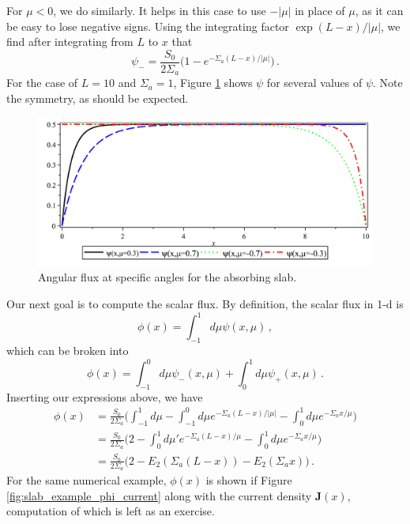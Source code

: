 For $\mu<0$, we do similarly.  It helps in this case to use $-|\mu|$ in place of $\mu$, as it can be easy to lose negative signs.  Using the integrating factor $\exp{(L-x)/|\mu|}$, we find after integrating from $L$ to $x$ that
\begin{equation}
 \psi_{-} = \frac{S_0}{2\Sigma_a}\Bigg (1 - e^{-\Sigma_a (L-x)/|\mu|} \Bigg ) \, .
\end{equation}
For the case of $L = 10$ and $\Sigma_a = 1$, Figure \ref{fig:slab_example_psi} shows $\psi$ for several values of $\psi$.  Note the symmetry, as should be expected. 

\begin{figure}[ht] 
    \centering
    \includegraphics[keepaspectratio, width = 5.0 in]{images/slab_example_psi}
    \caption{Angular flux at specific angles for the absorbing slab.}
    \label{fig:slab_example_psi}
\end{figure}

Our next goal is to compute the scalar flux.  By definition, the scalar flux in 1-d is
\begin{equation}
 \phi(x) = \int^1_{-1} d\mu \psi(x,\mu) \, ,
\end{equation}
which can be broken into
\begin{equation}
  \phi(x) = \int^0_{-1} d\mu \psi_{-}(x,\mu) + \int^1_{0} d\mu \psi_{+}(x,\mu) \, .
\end{equation}
Inserting our expressions above, we have
\begin{equation}
\begin{split}
  \phi(x) &= \frac{S_0}{2\Sigma_a} \Bigg (  \int^{1}_{-1} d\mu - \int^0_{-1} d\mu  e^{-\Sigma_a (L-x)/|\mu|} - \int^1_{0} d\mu e^{-\Sigma_a x/\mu}  \Bigg ) \\
          &= \frac{S_0}{2\Sigma_a} \Bigg ( 2 - \int^1_{0} d\mu'  e^{-\Sigma_a (L-x)/\mu} - \int^1_{0} d\mu e^{-\Sigma_a x/\mu}  \Bigg ) \\
          &= \frac{S_0}{2\Sigma_a} \Bigg ( 2 - E_2(\Sigma_a (L-x)) - E_2(\Sigma_a x)  \Bigg ) \, .
\end{split}
\end{equation}
For the same numerical example, $\phi(x)$ is shown if Figure \ref{fig:slab_example_phi_current} along with the current density $\mathbf{J}(x)$, computation of which is left as an exercise.

